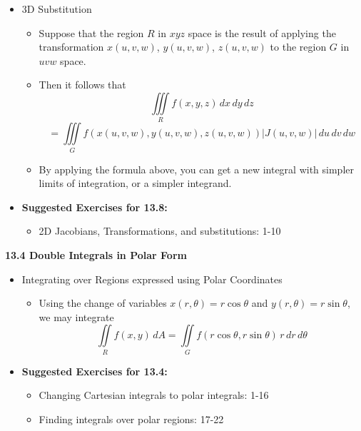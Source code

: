 \documentclass[12pt]{article}
\theoremstyle{plain}
\theoremstyle{definition}
\theoremstyle{remark}
\newcommand{\dvar}[1]{\,d{#1}}
\begin{document}
\begin{itemize}
	\item 3D Substitution
	
		\begin{itemize}
		\item Suppose that the region $R$ in $xyz$ space is the result of applying the transformation $x(u,v,w)$, $y(u,v,w)$, $z(u,v,w)$ to the region $G$ in $uvw$ space.
		\item Then it follows that \[\iiint\limits_R f(x,y,z)\,dx\,dy\,dz \]\[= \iiint\limits_G f(x(u,v,w),y(u,v,w),z(u,v,w))|J(u,v,w)|\,du\,dv\,dw\]
		\item By applying the formula above, you can get a new integral with simpler limits of integration, or a simpler integrand.
		\end{itemize}
				
	\item \textbf{Suggested Exercises for 13.8:}
	
		\begin{itemize}
		\item 2D Jacobians, Transformations, and substitutions: 1-10
		\end{itemize}
		
	\end{itemize}
	
	\newpage
	
	\centerline{\bf 13.4 Double Integrals in Polar Form}
	
	\begin{itemize}
	
	\item Integrating over Regions expressed using Polar Coordinates
		
		\begin{itemize}
		\item Using the change of variables $x(r,\theta)=r\cos\theta$ and $y(r,\theta)=r\sin\theta$, we may integrate \[\iint\limits_R f(x,y)\, dA = \iint\limits_G f(r\cos\theta,r\sin\theta)\,r\dvar{r}\dvar{\theta}\]
		\end{itemize}
			
	\item \textbf{Suggested Exercises for 13.4:}
	
		\begin{itemize}
		\item Changing Cartesian integrals to polar integrals: 1-16
		\item Finding integrals over polar regions: 17-22
		\end{itemize}
		
	\end{itemize}
	
\end{document}
